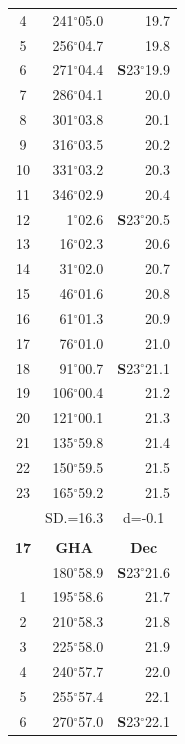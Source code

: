 \documentclass[10pt, a4paper]{report}
\begin{document}
\begin{scriptsize}
\begin{tabular*}{0.2\textwidth}[t]{@{\extracolsep{\fill}}|c|rr|}
4 & 241$^\circ$05.0 & 19.7\\
5 & 256$^\circ$04.7 & 19.8\\[2Pt]
6 & 271$^\circ$04.4 & \textbf{S}23$^\circ$19.9\\
7 & 286$^\circ$04.1 & 20.0\\
8 & 301$^\circ$03.8 & 20.1\\
9 & 316$^\circ$03.5 & \raisebox{0.24ex}{\boldmath$\cdot$~\boldmath$\cdot$~~}20.2\\
10 & 331$^\circ$03.2 & 20.3\\
11 & 346$^\circ$02.9 & 20.4\\[2Pt]
12 & 1$^\circ$02.6 & \textbf{S}23$^\circ$20.5\\
13 & 16$^\circ$02.3 & 20.6\\
14 & 31$^\circ$02.0 & 20.7\\
15 & 46$^\circ$01.6 & \raisebox{0.24ex}{\boldmath$\cdot$~\boldmath$\cdot$~~}20.8\\
16 & 61$^\circ$01.3 & 20.9\\
17 & 76$^\circ$01.0 & 21.0\\[2Pt]
18 & 91$^\circ$00.7 & \textbf{S}23$^\circ$21.1\\
19 & 106$^\circ$00.4 & 21.2\\
20 & 121$^\circ$00.1 & 21.3\\
21 & 135$^\circ$59.8 & \raisebox{0.24ex}{\boldmath$\cdot$~\boldmath$\cdot$~~}21.4\\
22 & 150$^\circ$59.5 & 21.5\\
23 & 165$^\circ$59.2 & 21.5\\
\hline
\rule{0pt}{2.4ex} & \multicolumn{1}{c}{SD.=16.3} & \multicolumn{1}{c|}{d=-0.1}\\
\hline
\multicolumn{1}{c}{}\\[-0.5ex]\hline
\multicolumn{1}{|c|}{\rule{0pt}{2.6ex}\textbf{17}} & \multicolumn{1}{c}{\textbf{GHA}} & \multicolumn{1}{c|}{\textbf{Dec}}\\
\hline\rule{0pt}{2.6ex}\noindent
0 & 180$^\circ$58.9 & \textbf{S}23$^\circ$21.6\\
1 & 195$^\circ$58.6 & 21.7\\
2 & 210$^\circ$58.3 & 21.8\\
3 & 225$^\circ$58.0 & \raisebox{0.24ex}{\boldmath$\cdot$~\boldmath$\cdot$~~}21.9\\
4 & 240$^\circ$57.7 & 22.0\\
5 & 255$^\circ$57.4 & 22.1\\[2Pt]
6 & 270$^\circ$57.0 & \textbf{S}23$^\circ$22.1\\

\end{tabular*}
\end{scriptsize}
\end{document}
